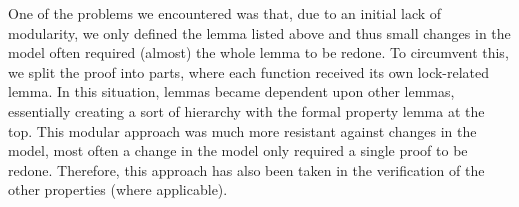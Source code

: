 One of the problems we encountered was that, due to an initial lack of modularity, we only defined the lemma listed above and thus small changes in the model often required (almost) the whole lemma to be redone. To circumvent this, we split the proof into parts, where each function received its own lock-related lemma. In this situation, lemmas became dependent upon other lemmas, essentially creating a sort of hierarchy with the formal property lemma at the top. This modular approach was much more resistant against changes in the model, most often a change in the model only required a single proof to be redone. Therefore, this approach has also been taken in the verification of the other properties (where applicable).